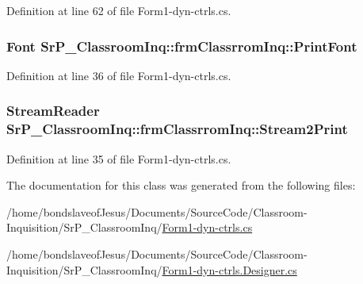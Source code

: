 \-Definition at line 62 of file \-Form1-\/dyn-\/ctrls.\-cs.

\hypertarget{class_sr_p___classroom_inq_1_1frm_classrrom_inq_a314e4a61ea8458c5198273335dcf0b5f}{
\subsubsection[{\-Print\-Font}]{\setlength{\rightskip}{0pt plus 5cm}\-Font {\bf \-Sr\-P\-\_\-\-Classroom\-Inq\-::frm\-Classrrom\-Inq\-::\-Print\-Font}}}
\label{class_sr_p___classroom_inq_1_1frm_classrrom_inq_a314e4a61ea8458c5198273335dcf0b5f}


\-Definition at line 36 of file \-Form1-\/dyn-\/ctrls.\-cs.

\hypertarget{class_sr_p___classroom_inq_1_1frm_classrrom_inq_aa030f46a7915eae3a0b8b88661be51a8}{
\subsubsection[{\-Stream2\-Print}]{\setlength{\rightskip}{0pt plus 5cm}\-Stream\-Reader {\bf \-Sr\-P\-\_\-\-Classroom\-Inq\-::frm\-Classrrom\-Inq\-::\-Stream2\-Print}}}
\label{class_sr_p___classroom_inq_1_1frm_classrrom_inq_aa030f46a7915eae3a0b8b88661be51a8}


\-Definition at line 35 of file \-Form1-\/dyn-\/ctrls.\-cs.



\-The documentation for this class was generated from the following files\-:\begin{DoxyCompactItemize}
\item 
/home/bondslaveof\-Jesus/\-Documents/\-Source\-Code/\-Classroom-\/\-Inquisition/\-Sr\-P\-\_\-\-Classroom\-Inq/\hyperlink{_form1-dyn-ctrls_8cs}{\-Form1-\/dyn-\/ctrls.\-cs}\item 
/home/bondslaveof\-Jesus/\-Documents/\-Source\-Code/\-Classroom-\/\-Inquisition/\-Sr\-P\-\_\-\-Classroom\-Inq/\hyperlink{_form1-dyn-ctrls_8_designer_8cs}{\-Form1-\/dyn-\/ctrls.\-Designer.\-cs}\end{DoxyCompactItemize}

